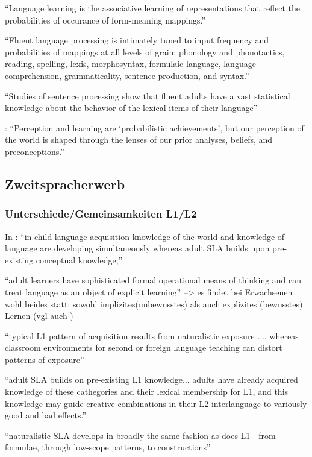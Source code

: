         ``Language learning is the associative learning of representations that reflect the probabilities of occurance of form-meaning mappings.''

        ``Fluent language processing is intimately tuned to input frequency and probabilities of mappings at all levels of grain: phonology and phonotactics, reading, spelling, lexis, morphosyntax, formulaic language, language comprehension, grammaticality, sentence production, and syntax.''

        ``Studies of sentence processing show that fluent adults have a vast statistical knowledge about the behavior of the lexical items of their language''

        \cite{Ellis06}: ``Perception and
        learning are ‘probabilistic achievements’, but our perception of the world is
        shaped through the lenses of our prior analyses, beliefs, and preconceptions.''

\subsection{Zweitspracherwerb}
\subsubsection{Unterschiede/Gemeinsamkeiten L1/L2}

        In \cite{Ellis08}: ``in child language acquisition knowledge of the world and knowledge of language are developing simultaneously whereas adult SLA builds upon pre-existing conceptual knowledge;''

        ``adult learners have sophisticated formal operational means of thinking and can treat language as an object of explicit learning''
        --> es findet bei Erwachsenen wohl beides statt: sowohl implizites(unbewusstes) als auch explizites (bewusstes) Lernen (vgl auch \cite{Ellis04})

        ``typical L1 pattern of acquisition results from naturalistic exposure .... whereas classroom environments for second or foreign language teaching can distort patterns of exposure''

        ``adult SLA builds on pre-existing L1 knowledge... adults have already acquired knowledge of these cathegories and their lexical membership for L1, and this knowledge may guide creative combinations in their L2 interlanguage to variously good and bad effects.''

        ``naturalistic SLA develops in broadly the same fashion as does L1 - from formulae, through low-scope patterns, to constructions''

